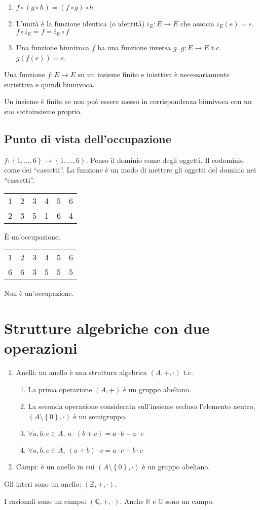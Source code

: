 \begin{enumerate}
    \item $f \circ \left( g \circ h \right) = \left( f \circ g \right) \circ h$ 
    \item L'unit\`a \`e la funzione identica (o identit\`a) $i_E : E \to E$ che associa $i_E(e) = e$. $f \circ i_E = f = i_E \circ f$ 
    \item Una funzione biunivoca $f$ ha una funzione inversa $g$. $g : E \to E $ t.c. $ g(f(e)) = e$.
\end{enumerate}

Una funzione $f : E \to E $ su un insieme finito e iniettiva \`e necessariamente suriettiva e quindi biunivoca.

Un insieme \`e finito se non pu\`o essere messo in corrispondenza biunivoca con un suo sottoinsieme proprio.

\subsection{Punto di vista dell'occupazione}

$f : \left \{ 1, \dots, 6 \right \} \to \left \{ 1, \dots, 6 \right \}$. Penso il dominio come degli oggetti. Il codominio come dei ``cassetti''. La funzione \`e un modo di mettere gli oggetti del dominio nei ``cassetti''.

\begin{tabular}{cccccc}
1 & 2 & 3 & 4 & 5 & 6 \\
2 & 3 & 5  &1 & 6 & 4
\end{tabular}
\`E un'occupazione.

\begin{tabular}{cccccc}
1 & 2 & 3 & 4 & 5 & 6 \\
6 & 6 & 3 & 5 & 5 & 5
\end{tabular}
Non \`e un'occupazione.

\section{Strutture algebriche con due operazioni}

\begin{enumerate}
    \item Anelli: un anello \`e una struttura algebrica $(A, +, \cdot)$ t.c. 
    \begin{enumerate}
        \item La prima operazione $\left( A, + \right )$ \`e un gruppo abeliano.
        \item La seconda operazione considerata sull'insieme escluso l'elemento neutro, $(A \setminus \left \{ 0 \right \}, \cdot )$ \`e un semigruppo.
        \item $ \forall a, b, c \in A , \ a \cdot (b + c) = a \cdot b + a \cdot c $
        \item $ \forall a, b, c \in A , \ (a + b) \cdot c = a \cdot c + b \cdot c $
    \end{enumerate}
    \item Campi: \`e un anello in cui $( A \setminus \left \{ 0 \right \}, \cdot )$ \`e un gruppo abeliano.
\end{enumerate}

Gli interi sono un anello: $\left ( \mathbb{Z}, +, \cdot \right )$.

I razionali sono un campo: $\left ( \mathbb{Q}, +, \cdot \right )$. Anche $\mathbb{R}$ e $\mathbb{C}$ sono un campo.
